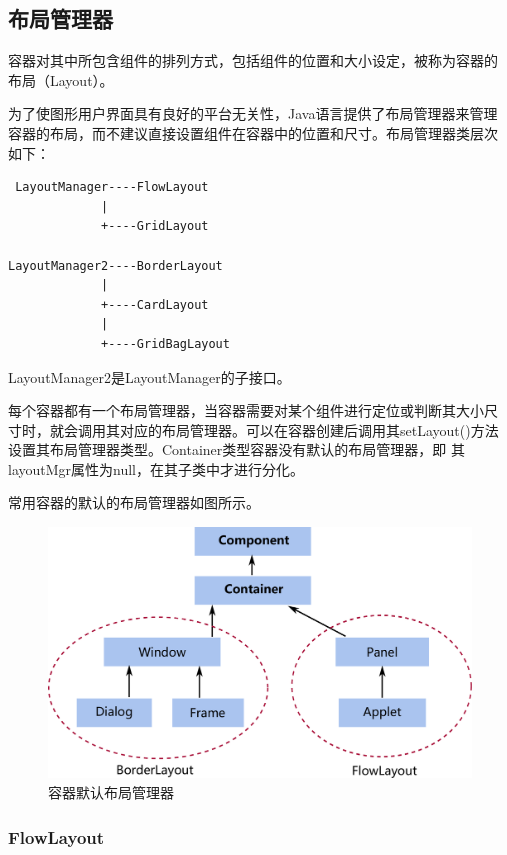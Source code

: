 
\subsection{布局管理器}

容器对其中所包含组件的排列方式，包括组件的位置和大小设定，被称为容器的
布局（Layout）。

为了使图形用户界面具有良好的平台无关性，Java语言提供了布局管理器来管理
容器的布局，而不建议直接设置组件在容器中的位置和尺寸。布局管理器类层次
如下：

\begin{verbatim}
 LayoutManager----FlowLayout  
             |
             +----GridLayout

LayoutManager2----BorderLayout
             |
             +----CardLayout
             |
             +----GridBagLayout
\end{verbatim}


LayoutManager2是LayoutManager的子接口。


每个容器都有一个布局管理器，当容器需要对某个组件进行定位或判断其大小尺
寸时，就会调用其对应的布局管理器。可以在容器创建后调用其setLayout()方法
设置其布局管理器类型。Container类型容器没有默认的布局管理器，即
其layoutMgr属性为null，在其子类中才进行分化。

常用容器的默认的布局管理器如图所示。

\begin{figure}[htb]
\centering
\includegraphics[width=.7\textwidth]{images/Java-GUI-programming/fig-AWT-defaut-layout.pdf}
\caption{容器默认布局管理器}
\label{fig:fig-AWT-defaut-layout}
\end{figure}

\subsubsection{FlowLayout}

